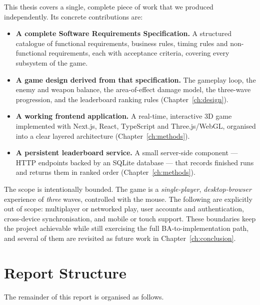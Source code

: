 \documentclass[12pt,a4paper]{report}
\begin{document}
This thesis covers a single, complete piece of work that we produced
independently. Its concrete contributions are:

\begin{itemize}
  \item \textbf{A complete Software Requirements Specification.} A structured
        catalogue of functional requirements, business rules, timing rules and
        non-functional requirements, each with acceptance criteria, covering
        every subsystem of the game.
  \item \textbf{A game design derived from that specification.} The gameplay
        loop, the enemy and weapon balance, the area-of-effect damage model, the
        three-wave progression, and the leaderboard ranking rules
        (Chapter~\ref{ch:design}).
  \item \textbf{A working frontend application.} A real-time, interactive 3D
        game implemented with Next.js, React, TypeScript and Three.js/WebGL,
        organised into a clear layered architecture (Chapter~\ref{ch:methods}).
  \item \textbf{A persistent leaderboard service.} A small server-side component
        --- HTTP endpoints backed by an SQLite database --- that records
        finished runs and returns them in ranked order (Chapter~\ref{ch:methods}).
\end{itemize}

The scope is intentionally bounded. The game is a \emph{single-player},
\emph{desktop-browser} experience of \emph{three} waves, controlled with the
mouse. The following are explicitly out of scope: multiplayer or networked play,
user accounts and authentication, cross-device synchronisation, and mobile or
touch support. These boundaries keep the project achievable while still
exercising the full BA-to-implementation path, and several of them are revisited
as future work in Chapter~\ref{ch:conclusion}.

\section{Report Structure}

The remainder of this report is organised as follows.
\end{document}
